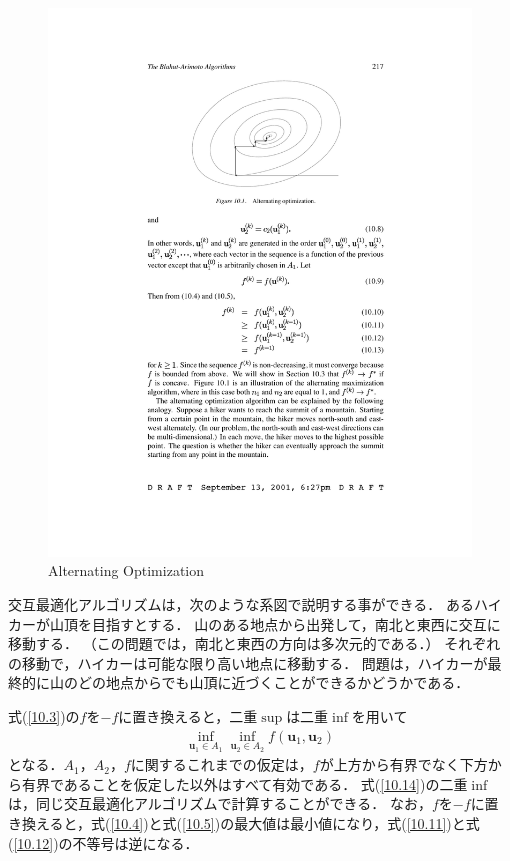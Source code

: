 \documentclass{ltjsarticle}
\begin{document}
\begin{figure}[htbp]
  \label{fig10.1}
  \begin{center}
  \includegraphics{Fig10-1.pdf}
  \caption{Alternating Optimization}
  \end{center}
\end{figure}

交互最適化アルゴリズムは，次のような系図で説明する事ができる．
あるハイカーが山頂を目指すとする．
山のある地点から出発して，南北と東西に交互に移動する．
（この問題では，南北と東西の方向は多次元的である．）
それぞれの移動で，ハイカーは可能な限り高い地点に移動する．
問題は，ハイカーが最終的に山のどの地点からでも山頂に近づくことができるかどうかである．

式(\ref{10.3})の$f$を$-f$に置き換えると，二重$\sup$は二重$\inf$を用いて
\begin{eqnarray}
  \label{10.14}
  \inf_{\mathbf{u}_1 \in A_1} \inf_{\mathbf{u}_2 \in A_2} f \left( \mathbf{u}_1, \mathbf{u}_2 \right)
\end{eqnarray}
となる．$A_1$，$A_2$，$f$に関するこれまでの仮定は，$f$が上方から有界でなく下方から有界であることを仮定した以外はすべて有効である．
式(\ref{10.14})の二重$\inf$は，同じ交互最適化アルゴリズムで計算することができる．
なお，$f$を$-f$に置き換えると，式(\ref{10.4})と式(\ref{10.5})の最大値は最小値になり，式(\ref{10.11})と式(\ref{10.12})の不等号は逆になる．
\end{document}
